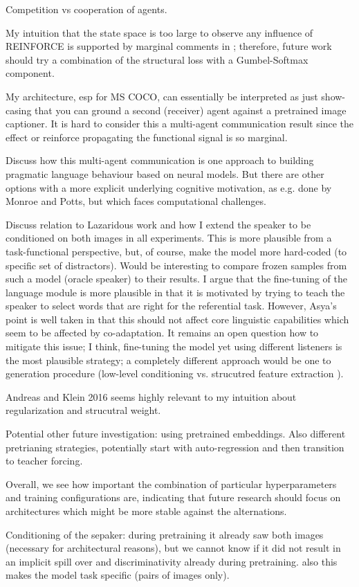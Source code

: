 
Competition vs cooperation of agents. 

My intuition that the state space is too large to observe any influence of REINFORCE is supported by marginal comments in \cite{havrylov2017emergence}; therefore, future work should try a combination of the structural loss with a Gumbel-Softmax component.

My architecture, esp for MS COCO, can essentially be interpreted as just show-casing that you can ground a second (receiver) agent against a pretrained image captioner. It is hard to consider this a multi-agent communication result since the effect or reinforce propagating the functional signal is so marginal. 

Discuss how this multi-agent communication is one approach to building pragmatic language behaviour based on neural models. But there are other options with a more explicit underlying cognitive motivation, as e.g. done by Monroe and Potts, but which faces computational challenges. 

Discuss relation to Lazaridous work and how I extend the speaker to be conditioned on both images in all experiments. This is more plausible from a task-functional perspective, but, of course, make the model more hard-coded (to specific set of distractors). Would be interesting to compare frozen samples from such a model (oracle speaker) to their results. I argue that the fine-tuning of the language module is more plausible in that it is motivated by trying to teach the speaker to select words that are right for the referential task. However, Asya's point is well taken in that this should not affect core linguistic capabilities which seem to be affected by co-adaptation. It remains an open question how to mitigate this issue; I think, fine-tuning the model yet using different listeners is the most plausible strategy; a completely different approach would be one to generation procedure (low-level conditioning vs. strucutred feature extraction ). 

Andreas and Klein 2016 seems highly relevant to my intuition about regularization and strucutral weight. 

Potential other future investigation: using pretrained embeddings.
Also different pretrianing strategies, potentially start with auto-regression and then transition to teacher forcing. 

Overall, we see how important the combination of particular hyperparameters and training configurations are, indicating that future research should focus on architectures which might be more stable against the alternations. 

Conditioning of the sepaker: during pretraining it already saw both images (necessary for architectural reasons), but we cannot know if it did not result in an implicit spill over and discriminativity already during pretraining. also this makes the model task specific (pairs of images only). 